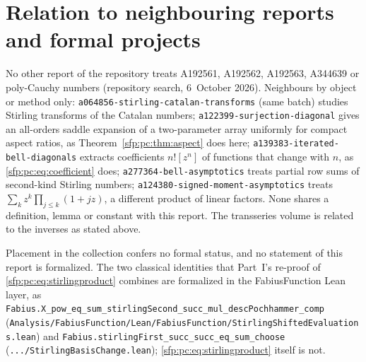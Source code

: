 \documentclass[11pt,letterpaper]{article}
\numberwithin{equation}{section}
\theoremstyle{definition}\newtheorem{definition}[theorem]{Definition}
\theoremstyle{remark}\newtheorem{remark}[theorem]{Remark}
\newcommand{\file}[1]{\nolinkurl{#1}}
\begin{document}
\section*{Relation to neighbouring reports and formal projects}\label{sfp:sec:neighbours}
No other report of the repository treats A192561, A192562, A192563, A344639 or poly-Cauchy numbers (repository search, 6~October 2026). Neighbours by object or method only: \file{a064856-stirling-catalan-transforms} (same batch) studies Stirling transforms of the Catalan numbers; \file{a122399-surjection-diagonal} gives an all-orders saddle expansion of a two-parameter array uniformly for compact aspect ratios, as Theorem~\ref{sfp:pc:thm:aspect} does here; \file{a139383-iterated-bell-diagonals} extracts coefficients $n![z^n]$ of functions that change with $n$, as \eqref{sfp:pc:eq:coefficient} does; \file{a277364-bell-asymptotics} treats partial row sums of second-kind Stirling numbers; \file{a124380-signed-moment-asymptotics} treats $\sum_kz^k\prod_{j\le k}(1+jz)$, a different product of linear factors. None shares a definition, lemma or constant with this report. The transseries volume \cite{TSvol} is related to the inverses as stated above.

Placement in the collection confers no formal status, and no statement of this report is formalized. The two classical identities that Part~I's re-proof of \eqref{sfp:pc:eq:stirlingproduct} combines are formalized in the FabiusFunction Lean layer, as \file{Fabius.X_pow_eq_sum_stirlingSecond_succ_mul_descPochhammer_comp} (\file{Analysis/FabiusFunction/Lean/FabiusFunction/StirlingShiftedEvaluations.lean}) and \file{Fabius.stirlingFirst_succ_succ_eq_sum_choose} (\file{.../StirlingBasisChange.lean}); \eqref{sfp:pc:eq:stirlingproduct} itself is not.
\clearpage
\end{document}

